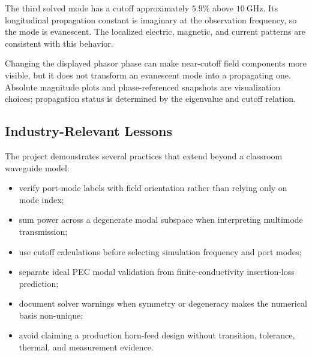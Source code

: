 The third solved mode has a cutoff approximately \(5.9\%\) above \(10~\mathrm{GHz}\). Its longitudinal propagation constant is imaginary at the observation frequency, so the mode is evanescent. The localized electric, magnetic, and current patterns are consistent with this behavior.

Changing the displayed phasor phase can make near-cutoff field components more visible, but it does not transform an evanescent mode into a propagating one. Absolute magnitude plots and phase-referenced snapshots are visualization choices; propagation status is determined by the eigenvalue and cutoff relation.

\subsection{Industry-Relevant Lessons}

The project demonstrates several practices that extend beyond a classroom waveguide model:

\begin{itemize}
  \item verify port-mode labels with field orientation rather than relying only on mode index;
  \item sum power across a degenerate modal subspace when interpreting multimode transmission;
  \item use cutoff calculations before selecting simulation frequency and port modes;
  \item separate ideal PEC modal validation from finite-conductivity insertion-loss prediction;
  \item document solver warnings when symmetry or degeneracy makes the numerical basis non-unique;
  \item avoid claiming a production horn-feed design without transition, tolerance, thermal, and measurement evidence.
\end{itemize}
